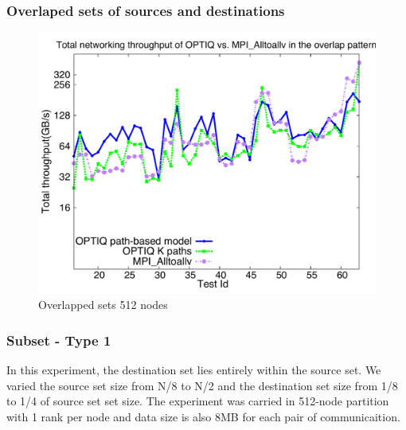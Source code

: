 \subsubsection{Overlaped sets of sources and destinations}

\begin{figure}[!htb]
\vspace{-0.1in}
\centering
\includegraphics[scale=0.30]{figures/overlap_512.pdf}
\vspace{-0.1in}
\caption{Overlapped sets 512 nodes}
\vspace{-0.1in}
\label{fig:overlap_512}
\end{figure}

\subsubsection{Subset - Type 1}

In this experiment, the destination set lies entirely within the source set. We varied the source set size from N/8 to N/2 and the destination set size from 1/8 to 1/4 of source set set size. The experiment was carried in 512-node partition with 1 rank per node and data size is also 8MB for each pair of communicaition.

